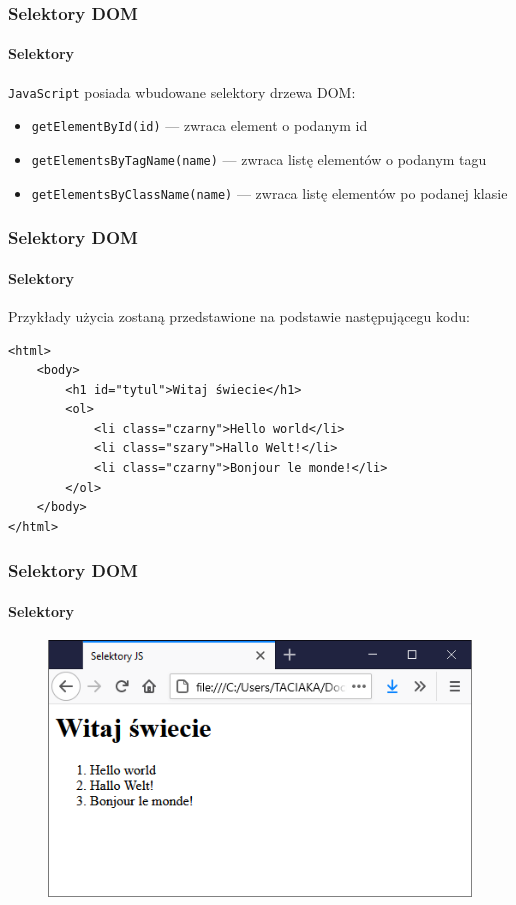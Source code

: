\begin{frame}[fragile]
  \frametitle{Selektory DOM}
  \framesubtitle{Selektory}

  \verb|JavaScript| posiada wbudowane selektory drzewa DOM:

  \begin{itemize}
    \item \verb|getElementById(id)| --- zwraca element o podanym id
    \item \verb|getElementsByTagName(name)| --- zwraca listę elementów o podanym tagu
    \item \verb|getElementsByClassName(name)| --- zwraca listę elementów po podanej klasie
  \end{itemize}

\end{frame}


\begin{frame}[fragile]
  \frametitle{Selektory DOM}
  \framesubtitle{Selektory}

  Przykłady użycia zostaną przedstawione na podstawie następującegu kodu:

  \begin{verbatim}
<html>
    <body>
        <h1 id="tytul">Witaj świecie</h1>
        <ol>
            <li class="czarny">Hello world</li>
            <li class="szary">Hallo Welt!</li>
            <li class="czarny">Bonjour le monde!</li>
        </ol>
    </body>
</html>
  \end{verbatim}

\end{frame}

\begin{frame}[fragile]
  \frametitle{Selektory DOM}
  \framesubtitle{Selektory}

  \begin{figure}
    \includegraphics[scale=0.75]{images/dom-selectors-example}
  \end{figure}

\end{frame}


